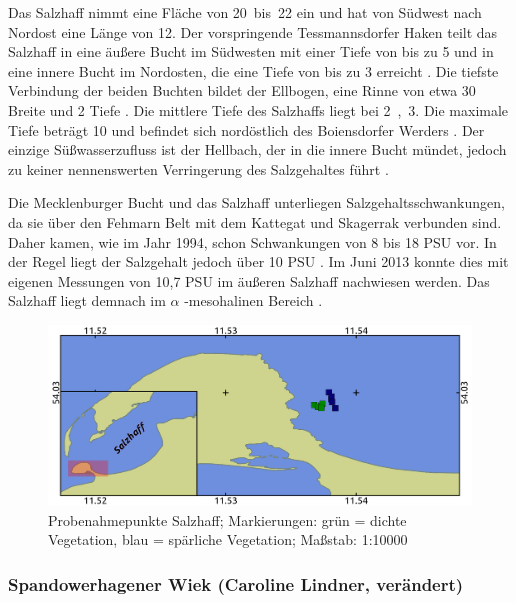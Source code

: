 Das Salzhaff nimmt eine Fläche von \unit{20 bis 22}{\kilo\metre\squared} ein und hat von Südwest nach Nordost eine Länge von \unit{12}{\kilo\metre}. Der vorspringende Tessmannsdorfer Haken teilt das Salzhaff in eine äußere Bucht im Südwesten mit einer Tiefe von bis zu \unit{5}{\metre} und in eine innere Bucht im Nordosten, die eine Tiefe von bis zu \unit{3}{\metre} erreicht \citep{weber_1997}. Die tiefste Verbindung der beiden Buchten bildet der Ellbogen, eine Rinne von etwa \unit{30}{\metre} Breite und \unit{2}{\metre} Tiefe \citep{kohn_1991}.
Die mittlere Tiefe des Salzhaffs liegt bei \unit{2,3}{\metre}. Die maximale Tiefe beträgt \unit{10}{\metre} und befindet sich nordöstlich des Boiensdorfer Werders \citep{kohn_1991}.
Der einzige Süßwasserzufluss ist der Hellbach, der in die innere Bucht mündet, jedoch zu keiner nennenswerten Verringerung des Salzgehaltes führt \citep{weber_1997}. 

Die Mecklenburger Bucht und das Salzhaff unterliegen Salzgehaltsschwankungen, da sie über den Fehmarn Belt mit dem Kattegat und Skagerrak verbunden sind. Daher kamen, wie im Jahr 1994, schon Schwankungen von 8 bis 18 PSU vor. In der Regel liegt der Salzgehalt jedoch über 10 PSU \citep{weber_1997}. Im Juni 2013 konnte dies mit eigenen Messungen von 10,7 PSU im äußeren Salzhaff nachwiesen werden. Das Salzhaff liegt demnach im $ \alpha$ -mesohalinen Bereich \citep{gosselck_2011}. 




\begin{figure}[htb]
\centering
\includegraphics[width=1\textwidth]{images/SH.png}
\caption[Probenahmepunkte Salzhaff]{Probenahmepunkte Salzhaff; Markierungen: grün = dichte Vegetation, blau = spärliche Vegetation; Maßstab: 1:10000}
\label{SH}
\end{figure}



\subsubsection{Spandowerhagener Wiek (Caroline Lindner, verändert)}

